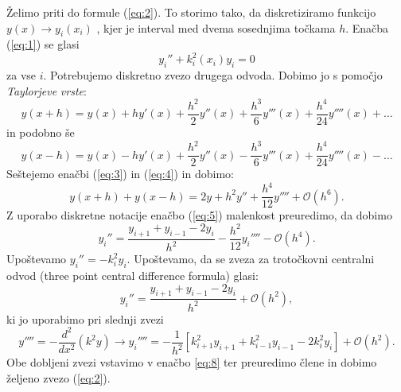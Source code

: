 \documentclass[12pt,a4paper]{article}
\begin{document}
Želimo priti do formule (\ref{eq:2}). To storimo tako, da diskretiziramo funkcijo $y(x) \rightarrow y_i(x_i)$ , kjer je interval med dvema sosednjima točkama $h$. Enačba (\ref{eq:1}) se glasi
\begin{equation}
 y_i '' + k_i^{2}(x_i)y_i=0
\end{equation}
za vse $i$. Potrebujemo diskretno zvezo drugega odvoda. Dobimo jo s pomočjo \textit{Taylorjeve} \textit{vrste}:
\begin{equation} \label{eq:3}
y(x+h)= y(x) +h y'(x) + \frac{h^{2}}{2}y'' (x) + \frac{h^{3}}{6}y'''(x) + \frac{h^{4}}{24} y''''(x) +\dots
\end{equation}
in podobno še
\begin{equation} \label{eq:4}
y(x-h)=y(x) -h y'(x) + \frac{h^{2}}{2}y'' (x) - \frac{h^{3}}{6}y'''(x) + \frac{h^{4}}{24} y''''(x) -\dots
\end{equation}
Seštejemo enačbi (\ref{eq:3}) in (\ref{eq:4}) in dobimo:
\begin{equation} \label{eq:5}
y(x+h) + y(x-h)= 2y + h^{2}y'' + \frac{h^{4}}{12}y'''' + \mathcal{O}(h^{6}).
\end{equation}
Z uporabo diskretne notacije enačbo (\ref{eq:5}) malenkost preuredimo, da dobimo
\begin{equation} \label{eq:8}
y_i'' = \frac{y_{i+1} + y_{i-1} -2y_i}{h^{2}} - \frac{h^{2}}{12}y_i '''' - \mathcal{O}(h^{4}).
\end{equation}
Upoštevamo $y_i ''= -k^{2}_i y_i$. Upoštevamo, da se zveza za trotočkovni centralni odvod (three point central difference formula) glasi:
\begin{equation}
 y_i '' = \frac{y_{i+1}+ y_{i-1} -2y_i}{h^{2}} + \mathcal{O}(h^{2}), \nonumber
\end{equation}
ki jo uporabimo pri  slednji zvezi
\begin{equation}
y '''' = -\frac{d^{2}}{dx^{2}}(k^{2}y) \rightarrow y_i '''' = -\frac{1}{h^{2}}[k^{2}_{i+1}y_{i+1} + k^{2} _{i-1}y_{i-1} - 2k^{2}_i y_i]+ \mathcal{O}(h^{2}).
\end{equation}
Obe dobljeni zvezi vstavimo v enačbo \ref{eq:8} ter preuredimo člene in dobimo željeno zvezo (\ref{eq:2}).
\end{document}
